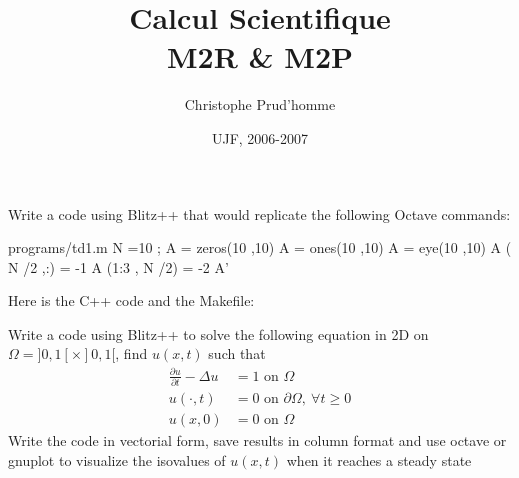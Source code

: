 \documentclass{article}
\title{Calcul Scientifique\\
  M2R \& M2P}
\author{Christophe Prud'homme}
\date{UJF, 2006-2007}
\begin{document}
\maketitle

\begin{Exercise}[label={exo1},title={Blitz++ versus Matlab}]
\Question Write a code using Blitz++ that would replicate the
following Octave commands:

\begin{filecontents*}{programs/td1.m}
N =10 ;
A = zeros(10 ,10)
A = ones(10 ,10)
A = eye(10 ,10)
A ( N /2 ,:) = -1
A (1:3 , N /2) = -2
A'
\end{filecontents*}


\end{Exercise}

\begin{Answer}

Here is the C++ code and the Makefile:



\end{Answer}

\begin{Exercise}[title={Heat Equation}]
  \Question Write a code using Blitz++ to solve the following equation in 2D
  on $\Omega = ] 0, 1 [ \times ]0, 1 [$, find $u(x,t)$ such that
  \begin{align}
    \label{eq:1}
    \displaystyle \frac{\partial u}{\partial t} - \Delta u &= 1 \mbox{ on } \Omega\\
    u(\cdot,t) &= 0 \mbox{ on } \partial \Omega,\ \forall t \geq 0 \\
    u(x,0) &= 0  \mbox{ on }  \Omega
  \end{align}
  Write the code in vectorial form, save results in column format
  and use octave or gnuplot to visualize the isovalues of $u(x,t)$
  when it reaches a steady state
  
\end{Exercise}
\end{document}
